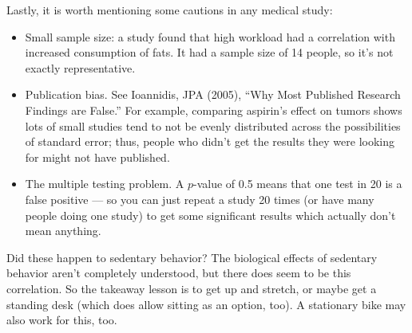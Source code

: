 Lastly, it is worth mentioning some cautions in any medical study:
\begin{itemize}
\item Small sample size: a study found that high workload had a correlation with increased consumption of fats. It had a sample size of 14 people, so it's not exactly representative.
\item Publication bias. See Ioannidis, JPA (2005), ``Why Most Published Research Findings are False.'' For example, comparing aspirin's effect on tumors shows lots of small studies tend to not be evenly distributed across the possibilities of standard error; thus, people who didn't get the results they were looking for might not have published.
\item The multiple testing problem. A $p$-value of 0.5 means that one test in 20 is a false positive --- so you can just repeat a study 20 times (or have many people doing one study) to get some significant results which actually don't mean anything.
\end{itemize}
Did these happen to sedentary behavior? The biological effects of sedentary behavior aren't completely understood, but there does seem to be this correlation. So the takeaway lesson is to get up and stretch, or maybe get a standing desk (which does allow sitting as an option, too). A stationary bike may also work for this, too.
